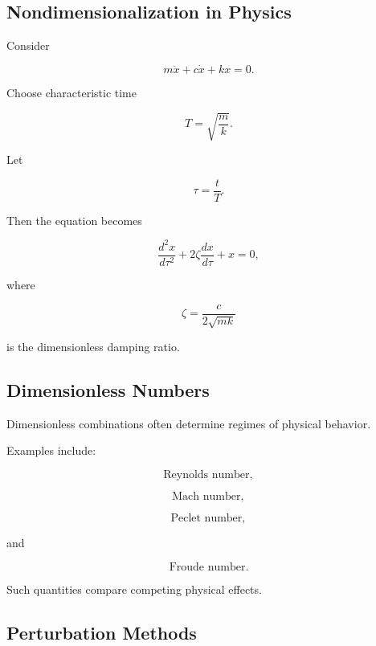 \subsection{Nondimensionalization in Physics}
\label{subsec:nondimensionalization-physics}

Consider

\[
m\ddot{x}
+
c\dot{x}
+
kx
=
0.
\]

Choose characteristic time

\[
\boxed{
T
=
\sqrt{\frac{m}{k}}.
}
\]

Let

\[
\tau
=
\frac{t}{T}.
\]

Then the equation becomes

\[
\boxed{
\frac{d^2x}{d\tau^2}
+
2\zeta
\frac{dx}{d\tau}
+
x
=
0,
}
\]

where

\[
\boxed{
\zeta
=
\frac{c}{2\sqrt{mk}}
}
\]

is the dimensionless damping ratio.

\subsection{Dimensionless Numbers}
\label{subsec:physical-dimensionless-numbers}

Dimensionless combinations often determine regimes of physical behavior.

Examples include:

\[
\boxed{
\text{Reynolds number},
}
\]

\[
\boxed{
\text{Mach number},
}
\]

\[
\boxed{
\text{Peclet number},
}
\]

and

\[
\boxed{
\text{Froude number}.
}
\]

Such quantities compare competing physical effects.

\subsection{Perturbation Methods}
\label{subsec:physical-perturbation-methods}

